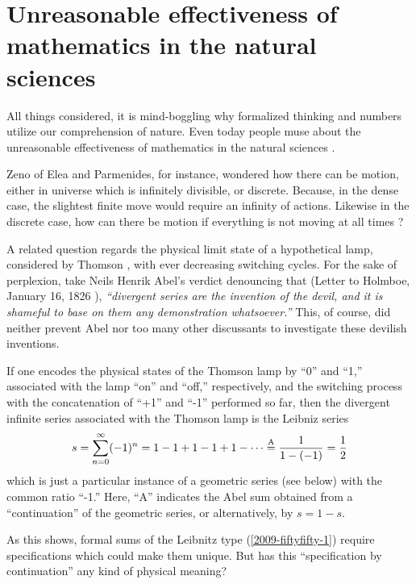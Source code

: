 \chapter{Unreasonable effectiveness of mathematics in the natural sciences}
\label{ch:uens}

All things considered, it is mind-boggling why formalized thinking and numbers utilize our comprehension
of nature.
Even today people muse about the unreasonable effectiveness of mathematics in the natural sciences \cite{wigner}.

Zeno of Elea and Parmenides, for instance, wondered how there can be motion,
either in universe which is infinitely divisible, or discrete.
Because, in the dense case, the slightest finite move would require an infinity of actions.
Likewise in the discrete case, how can there be motion if everything is not moving at all times \cite{zeno,benna:62,gruenbaum:68,Sainsbury}?

A related question regards the physical limit state of a hypothetical lamp, considered by Thomson \cite{thom:54}, with ever decreasing switching cycles.
For the sake of perplexion, take
Neils Henrik Abel's verdict denouncing that
(Letter to Holmboe, January 16, 1826 \cite{Hardy:1949}),
{\em ``divergent series are the invention of the devil, and it is shameful to base on them any demonstration whatsoever.''}
This, of course, did neither prevent Abel nor too many other discussants to investigate these devilish inventions.

If one encodes the physical states of the Thomson lamp by ``0'' and ``1,''
associated with the lamp ``on'' and ``off,'' respectively,
and the switching process with the concatenation of ``+1'' and ``-1'' performed so far, then
the divergent infinite series associated with the Thomson lamp is
the Leibniz series
\begin{equation}
s = \sum_{n=0}^\infty (-1)^n=1-1+1-1+1-\cdots \stackrel{{\rm A}}{=} \frac{1}{1-(-1)}= \frac{1}{2}
\label{2009-fiftyfifty-1}
\end{equation}
which is just a particular instance of a geometric series (see below) with the common ratio ``-1.''
Here, ``A'' indicates the Abel sum \cite{Hardy:1949} obtained from a ``continuation'' of the geometric series, or alternatively, by
$s= 1-s$.

As this shows, formal sums of the Leibnitz type (\ref{2009-fiftyfifty-1}) require specifications
which could make them unique.
But has this ``specification by continuation'' any kind of physical meaning?

